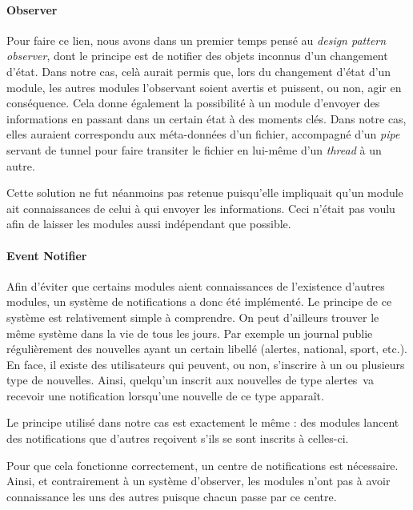 \documentclass[a4paper,10pt, twoside]{report}
\begin{document}
\begin{spacing}{1.2}
\paragraph{Observer\\}
Pour faire ce lien, nous avons dans un premier temps pensé au
\textit{design pattern} \textit{observer}, dont le principe est de notifier des
objets inconnus d'un changement d'état. Dans notre cas, celà aurait permis
que, lors du changement d'état d'un module, les autres modules l'observant
soient avertis et puissent, ou non, agir en conséquence. Cela donne
également la possibilité à un module d'envoyer des informations en
passant dans un certain état à des moments clés. Dans notre cas, elles
auraient correspondu aux méta-données d'un fichier, accompagné d'un
\textit{pipe} servant de tunnel pour faire transiter le fichier en lui-même
d'un \textit{thread} à un autre.

Cette solution ne fut néanmoins pas retenue puisqu'elle impliquait qu'un
module ait connaissances de celui à qui envoyer les informations. Ceci
n'était pas voulu afin de laisser les modules aussi indépendant que
possible.

\paragraph{Event Notifier\\}
Afin d'éviter que certains modules aient connaissances de l'existence d'autres
modules, un système de notifications a donc été implémenté. Le
principe de ce système est relativement simple à comprendre. On peut
d'ailleurs trouver le même système dans la vie de tous les jours. Par
exemple un journal publie régulièrement des nouvelles ayant un certain
libellé (\flqq alertes\frqq, \flqq national\frqq, \flqq sport\frqq, etc.).
En face, il existe des utilisateurs qui peuvent, ou non, s'inscrire à un ou
plusieurs type de nouvelles. Ainsi, quelqu'un inscrit aux nouvelles de type
\flqq alertes\frqq~va recevoir une notification lorsqu'une nouvelle de ce type
apparaît.

Le principe utilisé dans notre cas est exactement le même : des modules
lancent des notifications que d'autres reçoivent s'ils se sont inscrits à
celles-ci.

Pour que cela fonctionne correctement, un centre de notifications est
nécessaire. Ainsi, et contrairement à un système d'\flqq observer\frqq,
les modules n'ont pas à avoir connaissance les uns des autres puisque chacun
passe par ce centre.


\end{spacing}
\end{document}
